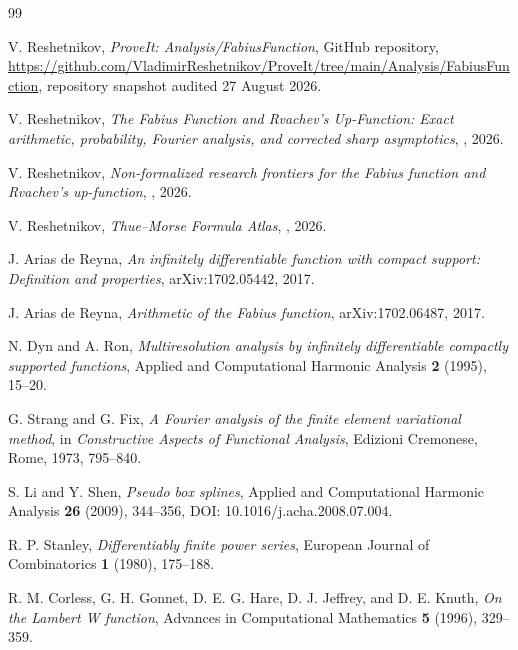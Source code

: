 \documentclass[11pt]{article}
\numberwithin{equation}{section}
\theoremstyle{definition}
\theoremstyle{remark}
\begin{document}
\begin{thebibliography}{99}

V. Reshetnikov,
\emph{ProveIt: Analysis/FabiusFunction}, GitHub repository,
\url{https://github.com/VladimirReshetnikov/ProveIt/tree/main/Analysis/FabiusFunction},
repository snapshot audited 27 August 2026.

V. Reshetnikov,
\emph{The Fabius Function and Rvachev's Up-Function: Exact arithmetic, probability, Fourier analysis, and corrected sharp asymptotics},
, 2026.

V. Reshetnikov,
\emph{Non-formalized research frontiers for the Fabius function and Rvachev's up-function},
, 2026.

V. Reshetnikov,
\emph{Thue--Morse Formula Atlas},
, 2026.

J. Arias de Reyna,
\emph{An infinitely differentiable function with compact support: Definition and properties},
arXiv:1702.05442, 2017.

J. Arias de Reyna,
\emph{Arithmetic of the Fabius function},
arXiv:1702.06487, 2017.

N. Dyn and A. Ron,
\emph{Multiresolution analysis by infinitely differentiable compactly supported functions},
Applied and Computational Harmonic Analysis \textbf{2} (1995), 15--20.

G. Strang and G. Fix,
\emph{A Fourier analysis of the finite element variational method},
in \emph{Constructive Aspects of Functional Analysis}, Edizioni Cremonese, Rome, 1973, 795--840.

S. Li and Y. Shen,
\emph{Pseudo box splines},
Applied and Computational Harmonic Analysis \textbf{26} (2009), 344--356,
DOI: 10.1016/j.acha.2008.07.004.

R. P. Stanley,
\emph{Differentiably finite power series},
European Journal of Combinatorics \textbf{1} (1980), 175--188.

R. M. Corless, G. H. Gonnet, D. E. G. Hare, D. J. Jeffrey, and D. E. Knuth,
\emph{On the Lambert W function},
Advances in Computational Mathematics \textbf{5} (1996), 329--359.


\end{thebibliography}
\end{document}
